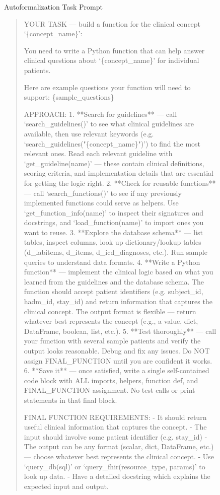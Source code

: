 \begin{figure}[h]
    \begin{AIbox}{Autoformalization Task Prompt}

\begin{quote}
\ttfamily
\tiny
\vspace{2mm}

YOUR TASK --- build a function for the clinical concept `\{concept\_name\}':

You need to write a Python function that can help answer clinical
questions about `\{concept\_name\}' for individual patients.

Here are example questions your function will need to support:
\{sample\_questions\}

APPROACH:
1. **Search for guidelines** --- call `search\_guidelines()' to see what clinical
   guidelines are available, then use relevant keywords (e.g.
   `search\_guidelines("\{concept\_name\}")') to find the most relevant ones.
   Read each relevant guideline with `get\_guideline(name)' --- these contain
   clinical definitions, scoring criteria, and implementation details that
   are essential for getting the logic right.
2. **Check for reusable functions** --- call `search\_functions()' to see if any
   previously implemented functions could serve as helpers. Use
   `get\_function\_info(name)' to inspect their signatures and docstrings,
   and `load\_function(name)' to import ones you want to reuse.
3. **Explore the database schema** --- list tables, inspect columns, look up
   dictionary/lookup tables (d\_labitems, d\_items, d\_icd\_diagnoses, etc.).
   Run sample queries to understand data formats.
4. **Write a Python function** --- implement the clinical logic based on what
   you learned from the guidelines and the database schema.  The function
   should accept patient identifiers (e.g. subject\_id, hadm\_id, stay\_id)
   and return information that captures the clinical concept.
   The output format is flexible --- return whatever best represents the
   concept (e.g., a value, dict, DataFrame, boolean, list, etc.).
5. **Test thoroughly** --- call your function with several sample patients
   and verify the output looks reasonable.  Debug and fix any issues.
   Do NOT assign FINAL\_FUNCTION until you are confident it works.
6. **Save it** --- once satisfied, write a single self-contained code block
   with ALL imports, helpers, function def, and FINAL\_FUNCTION assignment.
   No test calls or print statements in that final block.

FINAL FUNCTION REQUIREMENTS:
  - It should return useful clinical information that captures the concept.
  - The input should involve some patient identifier (e.g. stay\_id)
  - The output can be any format (scalar, dict, DataFrame, etc.) --- choose
    whatever best represents the clinical concept.
  - Use `query\_db(sql)' or `query\_fhir(resource\_type, params)' to look up data.
  - Have a detailed docstring which explains the expected input and output.


\end{quote}
\end{AIbox}
\end{figure}

